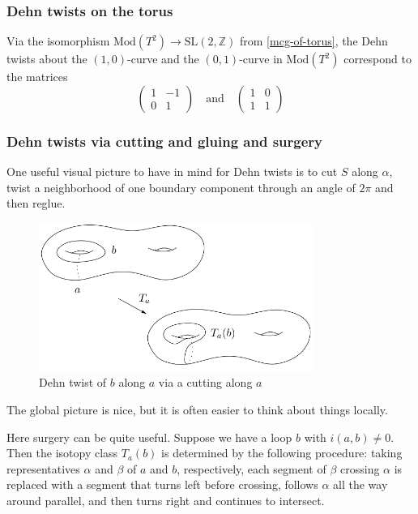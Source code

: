 \documentclass[reqno]{amsart}
\theoremstyle{definition}
\theoremstyle{remark}
\newcommand{\SL}{{\mathrm{SL}}}
\newcommand{\Mod}{{\mathrm{Mod}}}
\begin{document}
\subsubsection*{Dehn twists on the torus}
Via the isomorphism
$\Mod \left( T^2 \right)  \to \SL\left( 2, \mathbb{Z} \right) $ 
from \ref{mcg-of-torus}, the Dehn twists
about the $(1,0)$-curve and the $(0,1)$-curve
in $\Mod\left( T^2 \right) $ correspond to the
matrices
\[
    \begin{pmatrix} 1 & -1 \\ 0 & 1 \end{pmatrix} 
    \quad \text{and} \quad 
    \begin{pmatrix} 1 & 0 \\ 1 & 1 \end{pmatrix} 
\] 

\subsubsection{Dehn twists via cutting and gluing and surgery}
\label{dehn-twist-cut-glue-surgery}

One useful visual picture to have in mind for Dehn twists
is to cut $S$ along $\alpha$, twist a neighborhood of
one boundary component through an angle of $2\pi$ and then
reglue.

\begin{figure}[H]
    \centering
    \includegraphics[width=0.8\textwidth]{dehn-twist-cutting-and-gluing.png}
    \caption{Dehn twist of $b$ along $a$ via a
    cutting along $a$}
    \label{fig:dehn-twist-cutting-and-gluing-png}
\end{figure}

The global picture is nice, but it is often easier to think 
about things locally.

Here surgery can be quite useful. Suppose we have
a loop $b$ with $i \left( a,b \right) \neq 0$. Then
the isotopy class $T_a (b)$ is determined by the following
procedure: taking representatives $\alpha$ and $\beta$ of
$a$ and $b$, respectively, each segment of $\beta$ crossing
$\alpha$ is replaced with a segment that turns left before crossing,
follows $\alpha$ all the way around parallel, and then
turns right and continues to intersect. \\
\end{document}
